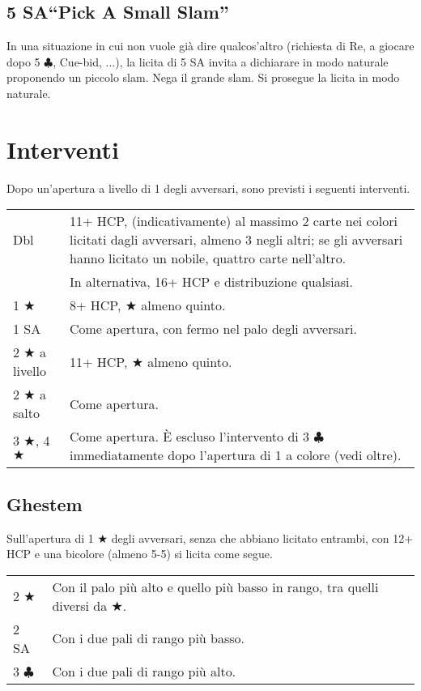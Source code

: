 \documentclass[a4paper,10pt]{article}
\renewcommand{\c}{$\clubsuit$\xspace}
\renewcommand{\j}{$\bigstar$\xspace}
\newcommand{\sa}{SA\xspace}
\newcommand{\smallspace}{\vskip0.3cm}
\newenvironment{twocol}
  {\smallspace\noindent\begin{tabular}{l p{0.78\textwidth}}}
  {\end{tabular}\smallspace}
\begin{document}
\subsection{5 \sa ``Pick A Small Slam''}

In una situazione in cui non vuole già dire qualcos'altro (richiesta di Re, a giocare dopo 5 \c, Cue-bid, ...), la licita di 5 \sa invita a dichiarare in modo naturale proponendo un piccolo slam. Nega il grande slam. Si prosegue la licita in modo naturale.



\pagebreak
\section{Interventi}

Dopo un'apertura a livello di 1 degli avversari, sono previsti i seguenti interventi.

\begin{twocol}
  Dbl & 11+ HCP, (indicativamente) al massimo 2 carte nei colori licitati dagli avversari, almeno 3 negli altri; se gli avversari hanno licitato un nobile, quattro carte nell'altro. \\
  & In alternativa, 16+ HCP e distribuzione qualsiasi.\\
  1 \j & 8+ HCP, \j almeno quinto.\\
  1 \sa & Come apertura, con fermo nel palo degli avversari.\\
  2 \j a livello & 11+ HCP, \j almeno quinto.\\
  2 \j a salto & Come apertura.\\
  3 \j, 4 \j & Come apertura. È escluso l'intervento di 3 \c immediatamente dopo l'apertura di 1 a colore (vedi oltre).
\end{twocol}

\subsection{Ghestem}
Sull'apertura di 1 \j degli avversari, senza che abbiano licitato entrambi, con 12+ HCP e una bicolore (almeno 5-5) si licita come segue.
\begin{twocol}
  2 \j & Con il palo più alto e quello più basso in rango, tra quelli diversi da \j.\\
  2 \sa & Con i due pali di rango più basso.\\
  3 \c & Con i due pali di rango più alto.
\end{twocol}
\end{document}
